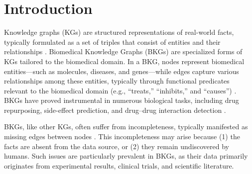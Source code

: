 \documentclass[11pt]{article}
\begin{document}
\begin{abstract}


\end{abstract}

\section{Introduction}

Knowledge graphs (KGs) are structured representations of real-world facts, typically formulated as a set of triples that consist of entities and their relationships \citep{nickel2015review,ji2021survey}. Biomedical Knowledge Graphs (BKGs) are specialized forms of KGs tailored to the biomedical domain. In a BKG, nodes represent biomedical entities—such as molecules, diseases, and genes—while edges capture various relationships among these entities, typically through functional predicates relevant to the biomedical domain (e.g., “treats,” “inhibits,” and “causes”) \citep{walsh2020biokg}. BKGs have proved instrumental in numerous biological tasks, including drug repurposing, side-effect prediction, and drug–drug interaction detection \citep{himmelstein2017systematic, zitnik2018modeling, lin2020kgnn}.

BKGs, like other KGs, often suffer from incompleteness, typically manifested as missing edges between nodes \citep{chen2020knowledge} . This incompleteness may arise because (1) the facts are absent from the data source, or (2) they remain undiscovered by humans. Such issues are particularly prevalent in BKGs, as their data primarily originates from experimental results, clinical trials, and scientific literature.
\end{document}
